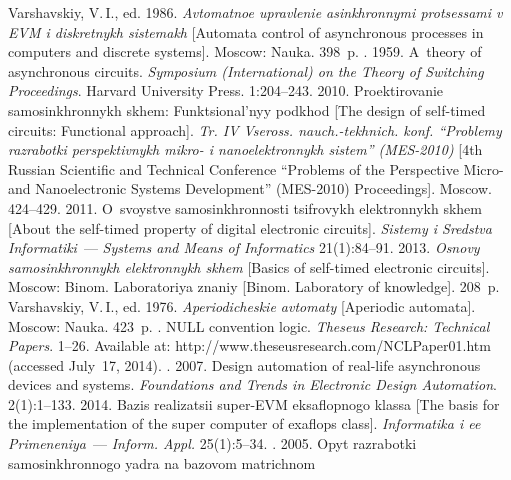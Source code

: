 \begin{multicols}{2}
{\small\frenchspacing
 {%
 \begin{thebibliography}{99}
Varshavskiy, V.\,I., ed. 1986.
\textit{Avtomatnoe upravlenie asinkhronnymi protsessami v EVM i
diskretnykh sistemakh} [Automata control of asynchronous processes
in computers and discrete
systems]. Moscow: Nauka. 398~p.
.
1959. A~theory of asynchronous circuits. \textit{Symposium (International) on the Theory
of Switching Proceedings}.  Harvard University Press. 1:204--243.
 2010.
Proektirovanie samosinkhronnykh skhem: Funktsional'nyy podkhod [The
design of self-timed circuits: Functional approach].
\textit{Tr. IV Vseross. nauch.-tekhnich.
konf. ``Problemy razrabotki perspektivnykh mikro- i nanoelektronnykh sistem''
(MES-2010)} [4th Russian Scientific and Technical Conference
``Problems of the Perspective Micro- and
Nanoelectronic Systems Development'' (MES-2010) Proceedings].
Moscow. 424--429.
 2011. O~svoystve samo\-sinkh\-ron\-nosti tsifrovykh elektronnykh skhem [About the
self-timed property of digital electronic circuits].
\textit{Sistemy i Sredstva Informatiki}~--- \textit{Systems and Means
of Informatics} 21(1):84--91.
 2013. \textit{Osnovy samosinkhronnykh elektronnykh skhem}
[Basics of self-timed
electronic circuits].
Moscow: Binom. Laboratoriya znaniy [Binom. Laboratory of knowledge]. 208~p.
Varshavskiy, V.\,I., ed. 1976. \textit{Aperiodicheskie avtomaty}
[Aperiodic automata]. Moscow: Nauka. 423~p.
.
NULL convention logic. \textit{Theseus Research: Technical Papers}. 1--26.
Available at: {\sf http://www.theseusresearch.com/NCLPaper01.htm} (accessed July~17,
2014).
. 2007. Design automation of real-life asynchronous devices and systems.
\textit{Foundations and Trends in Electronic Design
Automation}.  2(1):1--133.
2014. Bazis realizatsii super-EVM
eksaflopnogo klassa [The basis for the implementation of the super
computer of exaflops class].
\textit{Informatika i ee Primeneniya}~---
\textit{Inform. Appl.} 25(1):5--34.
.
2005. Opyt razrabotki samosinkhronnogo yadra na bazovom matrichnom

\end{thebibliography}}}
\end{multicols}
